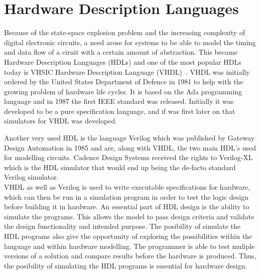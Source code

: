 \section{Hardware Description Languages}
Because of the state-space explosion problem and the increasing complexity of digital electronic circuits, a need arose for systems to be able to model the timing and data flow of a ciruit with a certain amount of abstraction. This became Hardware Description Languages (HDLs) and one of the most popular HDLs today is VHSIC Hardware Description Language (VHDL)~\cite{VHDL92}\cite{VHDL98}. VHDL was initially ordered by the United States Department of Defence in 1981 to help with the growing problem of hardware life cycles. It is based on the Ada programming language and in 1987 the first IEEE standard was released. Initially it was developed to be a pure specification language, and if was first later on that simulators for VHDL was developed.

Another very used HDL is the language Verilog which was published by Gateway Design Automation in 1985 and are, along with VHDL, the two main HDL's used for modelling circuits. Cadence Design Systems received the rights to Verilog-XL which is the HDL simulator that would end up being the de-facto standard Verilog simulator.\\

VHDL as well as Verilog is used to write executable specifications for hardware, which can then be run in a simulation program in order to test the logic design before building it in hardware. An essential part of HDL design is the ability to simulate the programs. This allows the model to pass design criteria and validate the design functionality and intended purpose. The posibility of simulate the HDL programs also give the opportunity of exploring the possibilities within the language and within hardware modelling. The programmer is able to test muliple versions of a solution and compare results before the hardware is produced. Thus, the posibility of simulating the HDL programs is essential for hardware design.


